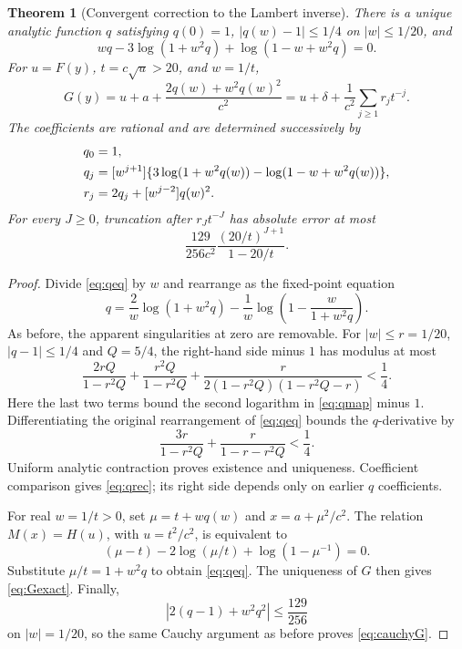 \documentclass[11pt]{article}
\numberwithin{equation}{section}
\newtheorem{theorem}{Theorem}[section]
\theoremstyle{definition}
\theoremstyle{remark}
\newcommand{\coeff}[2]{[#1^{#2}]}
\begin{document}
\begin{theorem}[Convergent correction to the Lambert inverse]\label{thm:q}
There is a unique analytic function $q$ satisfying $q(0)=1$,
$|q(w)-1|\le1/4$ on $|w|\le1/20$, and
\begin{equation}\label{eq:qeq}
 wq-3\log(1+w^2q)+\log(1-w+w^2q)=0.
\end{equation}
For $u=F(y)$, $t=c\sqrt u>20$, and $w=1/t$,
\begin{equation}\label{eq:Gexact}
 G(y)=u+a+\frac{2q(w)+w^2q(w)^2}{c^2}
 =u+\delta+\frac1{c^2}\sum_{j\ge1}r_jt^{-j}.
\end{equation}
The coefficients are rational and are determined successively by
\begin{align}
 q_0&=1,\notag\\
 q_j&=\coeff{w}{j+1}
 \{3\log(1+w^2q(w))-\log(1-w+w^2q(w))\},\label{eq:qrec}\\
 r_j&=2q_j+\coeff{w}{j-2}q(w)^2.\label{eq:rrec}
\end{align}
For every $J\ge0$, truncation after $r_Jt^{-J}$ has absolute error
at most
\begin{equation}\label{eq:cauchyG}
 \frac{129}{256c^2}\frac{(20/t)^{J+1}}{1-20/t}.
\end{equation}
\end{theorem}
\begin{proof}
Divide \eqref{eq:qeq} by $w$ and rearrange as the fixed-point equation
\begin{equation}\label{eq:qmap}
 q=\frac2w\log(1+w^2q)
 -\frac1w\log\!\left(1-\frac{w}{1+w^2q}\right).
\end{equation}
As before, the apparent singularities at zero are removable. For
$|w|\le r=1/20$, $|q-1|\le1/4$ and $Q=5/4$, the right-hand side minus
$1$ has modulus at most
\[
 \frac{2rQ}{1-r^2Q}
 +\frac{r^2Q}{1-r^2Q}
 +\frac{r}{2(1-r^2Q)(1-r^2Q-r)}<\frac14.
\]
Here the last two terms bound the second logarithm in
\eqref{eq:qmap} minus $1$. Differentiating the original rearrangement
of \eqref{eq:qeq} bounds the $q$-derivative by
\[
 \frac{3r}{1-r^2Q}+\frac{r}{1-r-r^2Q}<\frac14.
\]
Uniform analytic contraction proves existence and uniqueness.
Coefficient comparison gives \eqref{eq:qrec}; its right side depends
only on earlier $q$ coefficients.

For real $w=1/t>0$, set $\mu=t+wq(w)$ and $x=a+\mu^2/c^2$.
The relation $M(x)=H(u)$, with $u=t^2/c^2$, is equivalent to
\[
 (\mu-t)-2\log(\mu/t)+\log(1-\mu^{-1})=0.
\]
Substitute $\mu/t=1+w^2q$ to obtain \eqref{eq:qeq}. The uniqueness of
$G$ then gives \eqref{eq:Gexact}. Finally,
\[
 |2(q-1)+w^2q^2|\le\frac{129}{256}
\]
on $|w|=1/20$, so the same Cauchy argument as before proves
\eqref{eq:cauchyG}.
\end{proof}
\end{document}
